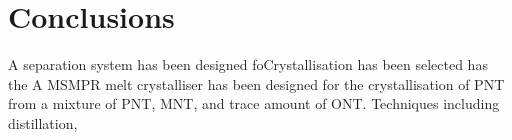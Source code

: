 \section{Conclusions}\label{separation conclusions}

A separation system has been designed foCrystallisation has been selected has the A MSMPR melt crystalliser has been designed for the crystallisation of PNT from a mixture of PNT, MNT, and trace amount of ONT. Techniques including distillation, 